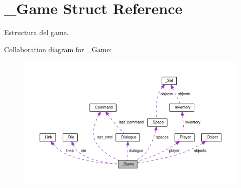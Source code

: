 \hypertarget{struct__Game}{\section{\+\_\+\+Game Struct Reference}
\label{struct__Game}
}


Estructura del game.  




Collaboration diagram for \+\_\+\+Game\+:
\nopagebreak
\begin{figure}[H]
\begin{center}
\leavevmode
\includegraphics[width=350pt]{struct__Game__coll__graph}
\end{center}
\end{figure}

